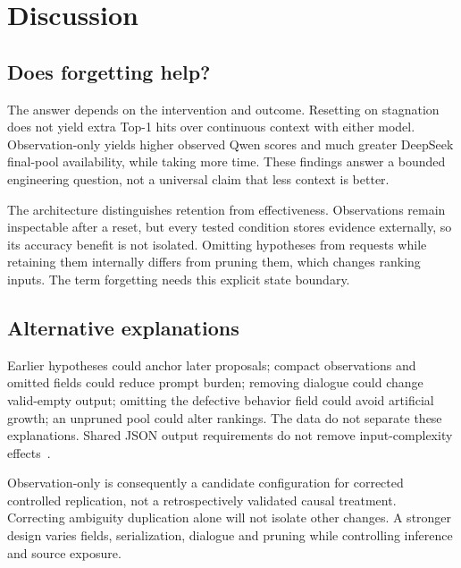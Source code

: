 \section{Discussion}\label{sec:discussion}
\subsection{Does forgetting help?}
The answer depends on the intervention and outcome. Resetting on stagnation does not yield extra Top-1 hits over continuous context with either model. Observation-only yields higher observed Qwen scores and much greater DeepSeek final-pool availability, while taking more time. These findings answer a bounded engineering question, not a universal claim that less context is better.

The architecture distinguishes retention from effectiveness. Observations remain inspectable after a reset, but every tested condition stores evidence externally, so its accuracy benefit is not isolated. Omitting hypotheses from requests while retaining them internally differs from pruning them, which changes ranking inputs. The term forgetting needs this explicit state boundary.

\subsection{Alternative explanations}
Earlier hypotheses could anchor later proposals; compact observations and omitted fields could reduce prompt burden; removing dialogue could change valid-empty output; omitting the defective behavior field could avoid artificial growth; an unpruned pool could alter rankings. The data do not separate these explanations. Shared JSON output requirements do not remove input-complexity effects~\citep{formatrestrict2024}.

Observation-only is consequently a candidate configuration for corrected controlled replication, not a retrospectively validated causal treatment. Correcting ambiguity duplication alone will not isolate other changes. A stronger design varies fields, serialization, dialogue and pruning while controlling inference and source exposure.

